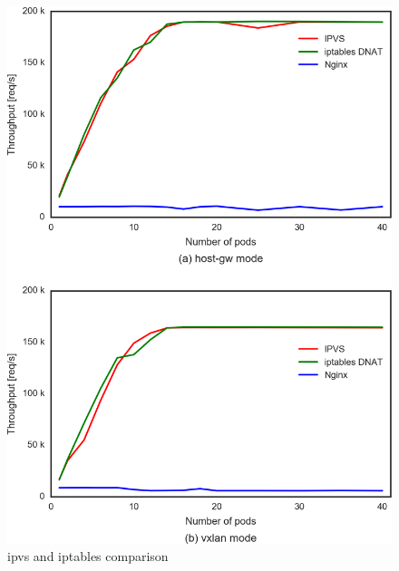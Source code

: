 \begin{figure}
\includegraphics[width=\columnwidth]{Figs/ipvs-iptables-nginx_2figs}
\caption{ipvs and iptables comparison}
\label{fig:ipvs-iptables-nginx_2figs}
\end{figure}




